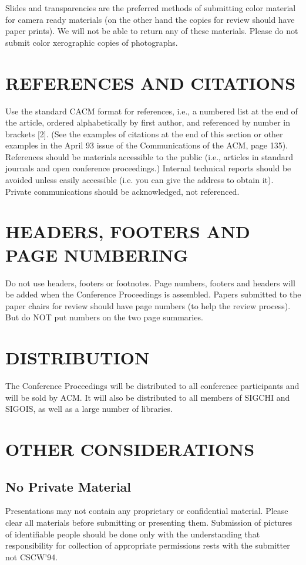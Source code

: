 Slides and transparencies are the preferred methods of submitting
color material for camera ready materials (on the other hand the
copies for review should have paper prints). We will not be able to
return any of these materials. Please do not submit color xerographic
copies of photographs.

\section{REFERENCES AND CITATIONS}
Use the standard CACM format for references, i.e., a numbered list at
the end of the article, ordered alphabetically by first author, and
referenced by number in brackets [2]. (See the examples of citations
at the end of this section or other examples in the April 93 issue of
the Communications of the ACM, page 135). References should be
materials accessible to the public (i.e., articles in standard journals
and open conference proceedings.)  Internal technical reports should
be avoided unless easily accessible (i.e. you can give the address to
obtain it).  Private communications should be acknowledged, not
referenced.

\section{HEADERS, FOOTERS AND PAGE NUMBERING}
Do not use headers, footers or footnotes. Page numbers, footers and
headers will be added when the Conference Proceedings is
assembled. Papers submitted to the paper chairs for review should
have page numbers (to help the review process).
But do NOT put numbers on the two page summaries.

\section{DISTRIBUTION}
The Conference Proceedings will be  distributed to all conference
participants and will be sold by ACM. It will also be distributed to all
members of SIGCHI and SIGOIS, as well as a large number of
libraries.

\section{OTHER CONSIDERATIONS}
\subsection{No Private Material}
Presentations may not contain any proprietary or confidential
material. Please clear all materials before submitting or presenting
them.  Submission of pictures of identifiable people should be done
only with the understanding that responsibility for collection of
appropriate permissions rests with the submitter not CSCW'94.

